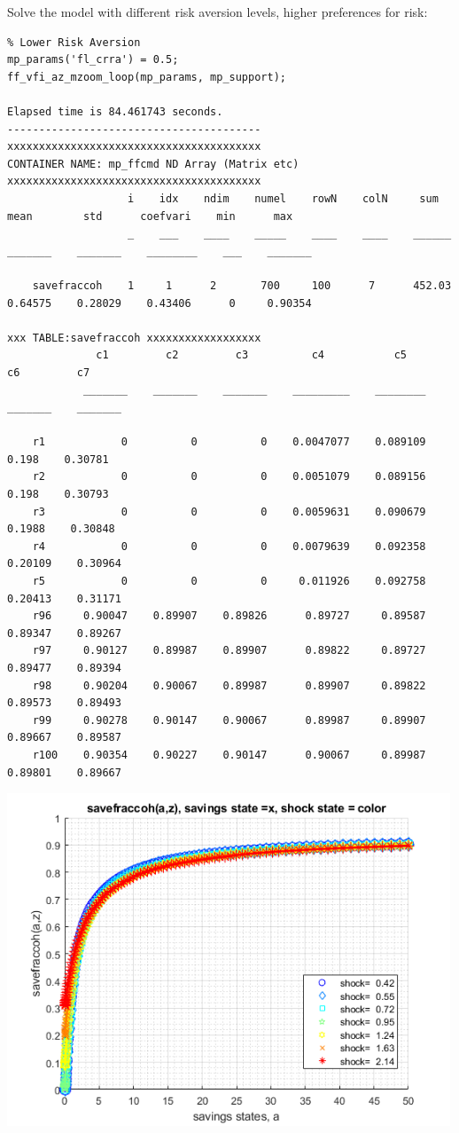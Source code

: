 \documentclass[
]{book}
\begin{document}
Solve the model with different risk aversion levels, higher preferences
for risk:

\begin{verbatim}
% Lower Risk Aversion
mp_params('fl_crra') = 0.5;
ff_vfi_az_mzoom_loop(mp_params, mp_support);

Elapsed time is 84.461743 seconds.
----------------------------------------
xxxxxxxxxxxxxxxxxxxxxxxxxxxxxxxxxxxxxxxx
CONTAINER NAME: mp_ffcmd ND Array (Matrix etc)
xxxxxxxxxxxxxxxxxxxxxxxxxxxxxxxxxxxxxxxx
                   i    idx    ndim    numel    rowN    colN     sum       mean        std      coefvari    min      max  
                   _    ___    ____    _____    ____    ____    ______    _______    _______    ________    ___    _______

    savefraccoh    1     1      2       700     100      7      452.03    0.64575    0.28029    0.43406      0     0.90354

xxx TABLE:savefraccoh xxxxxxxxxxxxxxxxxx
              c1         c2         c3          c4           c5         c6         c7   
            _______    _______    _______    _________    ________    _______    _______

    r1            0          0          0    0.0047077    0.089109      0.198    0.30781
    r2            0          0          0    0.0051079    0.089156      0.198    0.30793
    r3            0          0          0    0.0059631    0.090679     0.1988    0.30848
    r4            0          0          0    0.0079639    0.092358    0.20109    0.30964
    r5            0          0          0     0.011926    0.092758    0.20413    0.31171
    r96     0.90047    0.89907    0.89826      0.89727     0.89587    0.89347    0.89267
    r97     0.90127    0.89987    0.89907      0.89822     0.89727    0.89477    0.89394
    r98     0.90204    0.90067    0.89987      0.89907     0.89822    0.89573    0.89493
    r99     0.90278    0.90147    0.90067      0.89987     0.89907    0.89667    0.89587
    r100    0.90354    0.90227    0.90147      0.90067     0.89987    0.89801    0.89667
\end{verbatim}

\includegraphics[width=5.20833in,height=\textheight]{img/fx_vfi_az_mzoom_loop_images/figure_4.png}
\end{document}

